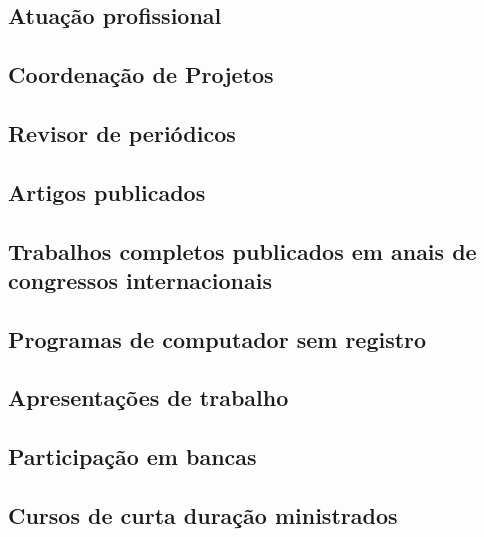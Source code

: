 \subsection{Atuação profissional}





\subsection{Coordenação de Projetos}





\subsection{Revisor de periódicos}


\subsection{Artigos publicados}





\subsection{Trabalhos completos publicados em anais de congressos internacionais}


\subsection{Programas de computador sem registro}


\subsection{Apresentações de trabalho}


\subsection{Participação em bancas}


\subsection{Cursos de curta duração ministrados}



%
